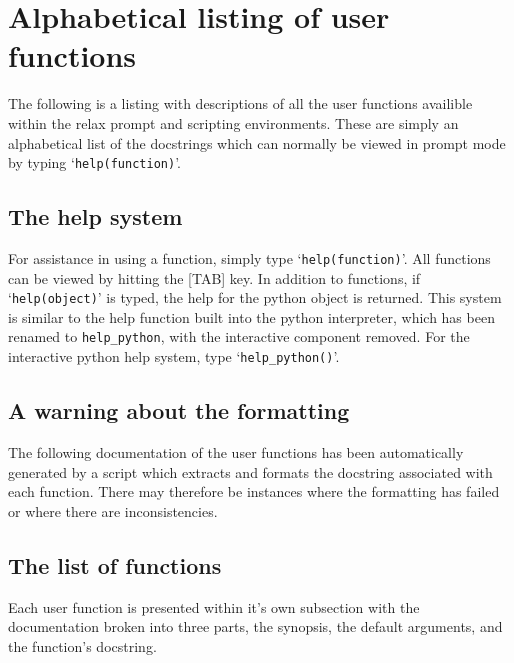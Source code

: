 
\chapter{Alphabetical listing of user functions}

The following is a listing with descriptions of all the user functions availible within the relax prompt and scripting environments.  These are simply an alphabetical list of the docstrings which can normally be viewed in prompt mode by typing `\texttt{help(function)}'.




\section{The help system}

For assistance in using a function, simply type `\texttt{help(function)}'.  All functions can be viewed by hitting the [TAB] key.  In addition to functions, if `\texttt{help(object)}' is typed, the help for the python object is returned.  This system is similar to the help function built into the python interpreter, which has been renamed to \texttt{help\_python}, with the interactive component removed.  For the interactive python help system, type `\texttt{help\_python()}'.




\section{A warning about the formatting}

The following documentation of the user functions has been automatically generated by a script which extracts and formats the docstring associated with each function.  There may therefore be instances where the formatting has failed or where there are inconsistencies.




\section{The list of functions}

Each user function is presented within it's own subsection with the documentation broken into three parts, the synopsis, the default arguments, and the function's docstring.


